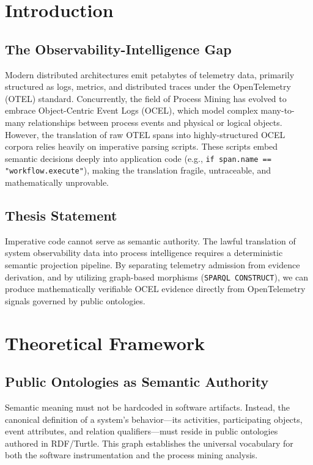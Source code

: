 \documentclass[12pt,a4paper,oneside]{book}
\begin{document}
\tableofcontents

\mainmatter

\chapter{Introduction}

\section{The Observability-Intelligence Gap}
Modern distributed architectures emit petabytes of telemetry data, primarily structured as logs, metrics, and distributed traces under the OpenTelemetry (OTEL) standard. Concurrently, the field of Process Mining has evolved to embrace Object-Centric Event Logs (OCEL), which model complex many-to-many relationships between process events and physical or logical objects. However, the translation of raw OTEL spans into highly-structured OCEL corpora relies heavily on imperative parsing scripts. These scripts embed semantic decisions deeply into application code (e.g., \texttt{if span.name == "workflow.execute"}), making the translation fragile, untraceable, and mathematically unprovable.

\section{Thesis Statement}
Imperative code cannot serve as semantic authority. The lawful translation of system observability data into process intelligence requires a deterministic semantic projection pipeline. By separating telemetry admission from evidence derivation, and by utilizing graph-based morphisms (\texttt{SPARQL CONSTRUCT}), we can produce mathematically verifiable OCEL evidence directly from OpenTelemetry signals governed by public ontologies.

\chapter{Theoretical Framework}

\section{Public Ontologies as Semantic Authority}
Semantic meaning must not be hardcoded in software artifacts. Instead, the canonical definition of a system's behavior—its activities, participating objects, event attributes, and relation qualifiers—must reside in public ontologies authored in RDF/Turtle. This graph establishes the universal vocabulary for both the software instrumentation and the process mining analysis.
\end{document}
